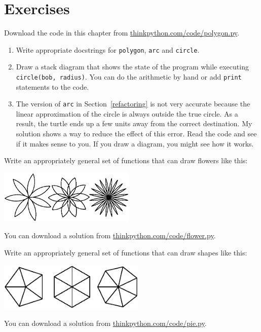 \documentclass[10pt]{book}
\begin{document}
\section{Exercises}

\begin{ex}

Download the code in this chapter from
\url{thinkpython.com/code/polygon.py}.

\begin{enumerate}

\item Write appropriate docstrings for {\tt polygon}, {\tt arc} and
{\tt circle}.


\item Draw a stack diagram that shows the state of the program
while executing {\tt circle(bob, radius)}.  You can do the
arithmetic by hand or add {\tt print} statements to the code.


\item The version of {\tt arc} in Section~\ref{refactoring} is not
very accurate because the linear approximation of the
circle is always outside the true circle.  As a result,
the turtle ends up a few units away from the correct
destination. My solution shows a way to reduce
the effect of this error.  Read the code and see if it makes
sense to you.  If you draw a diagram, you might see how it works.

\end{enumerate}

\end{ex}


\begin{ex}

Write an appropriately general set of functions that
can draw flowers like this:

\centerline{\includegraphics[height=1in]{figs/flowers.eps}}

You can download a solution from \url{thinkpython.com/code/flower.py}.

\end{ex}


\begin{ex}

Write an appropriately general set of functions that
can draw shapes like this:

\centerline{\includegraphics[height=0.9in]{figs/pies.eps}}

You can download a solution from \url{thinkpython.com/code/pie.py}.

\end{ex}
\end{document}
